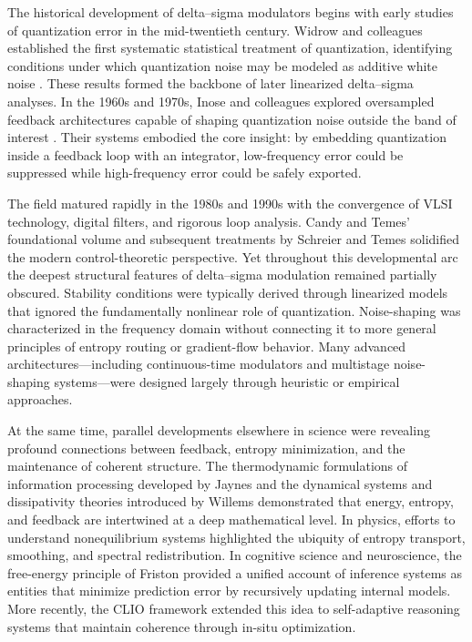 The historical development of delta--sigma modulators begins with early studies of quantization error in the mid-twentieth century. Widrow and colleagues established the first systematic statistical treatment of quantization, identifying conditions under which quantization noise may be modeled as additive white noise \citep{widrow1956statistical,widrow1959statistical}. These results formed the backbone of later linearized delta--sigma analyses. In the 1960s and 1970s, Inose and colleagues explored oversampled feedback architectures capable of shaping quantization noise outside the band of interest \citep{inose1962synthesis}. Their systems embodied the core insight: by embedding quantization inside a feedback loop with an integrator, low-frequency error could be suppressed while high-frequency error could be safely exported.

The field matured rapidly in the 1980s and 1990s with the convergence of VLSI technology, digital filters, and rigorous loop analysis. Candy and Temes’ foundational volume \citep{candy1992oversampling} and subsequent treatments by Schreier and Temes \citep{schreier2005understanding} solidified the modern control-theoretic perspective. Yet throughout this developmental arc the deepest structural features of delta--sigma modulation remained partially obscured. Stability conditions were typically derived through linearized models that ignored the fundamentally nonlinear role of quantization. Noise-shaping was characterized in the frequency domain without connecting it to more general principles of entropy routing or gradient-flow behavior. Many advanced architectures---including continuous-time modulators and multistage noise-shaping systems---were designed largely through heuristic or empirical approaches.

At the same time, parallel developments elsewhere in science were revealing profound connections between feedback, entropy minimization, and the maintenance of coherent structure. The thermodynamic formulations of information processing developed by Jaynes \citep{jaynes1957information1,jaynes1957information2} and the dynamical systems and dissipativity theories introduced by Willems \citep{willems1972dissipative} demonstrated that energy, entropy, and feedback are intertwined at a deep mathematical level. In physics, efforts to understand nonequilibrium systems highlighted the ubiquity of entropy transport, smoothing, and spectral redistribution. In cognitive science and neuroscience, the free-energy principle of Friston \citep{friston2010free,friston2019free} provided a unified account of inference systems as entities that minimize prediction error by recursively updating internal models. More recently, the CLIO framework \citep{cheng2025cognitiveloopinsituoptimization} extended this idea to self-adaptive reasoning systems that maintain coherence through in-situ optimization.

